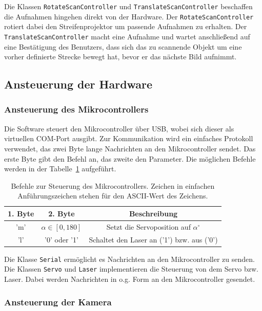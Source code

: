 \documentclass[ngerman,a4paper,parskip=half]{scrartcl}
\begin{document}
Die Klassen \texttt{RotateScanController} und \texttt{TranslateScanController} beschaffen die Aufnahmen hingehen direkt von der Hardware. Der \texttt{RotateScanController} rotiert dabei den Streifenprojektor um passende Aufnahmen zu erhalten. Der \texttt{TranslateScanController} macht eine Aufnahme und wartet anschließend auf eine Bestätigung des Benutzers, dass sich das zu scannende Objekt um eine vorher definierte Strecke bewegt hat, bevor er das nächste Bild aufnimmt.

\subsection{Ansteuerung der Hardware}

\subsubsection{Ansteuerung des Mikrocontrollers}

Die Software steuert den Mikrocontroller über USB, wobei sich dieser als virtuellen COM-Port ausgibt. Zur Kommunikation wird ein einfaches Protokoll verwendet, das zwei Byte lange Nachrichten an den Mikrocontroller sendet. Das erste Byte gibt den Befehl an, das zweite den Parameter. Die möglichen Befehle werden in der Tabelle~\ref{tab:protocol} aufgeführt.

\begin{table}
	\centering
	\begin{tabular}{|c|c|c|}
		\hline
		\bfseries 1. Byte & \bfseries 2. Byte & \bfseries Beschreibung \\
		\hline
		'm' & $\alpha \in [0,180]$ & Setzt die Servoposition auf $\alpha^\circ$\\
		\hline
		'l' & '0' oder '1' & Schaltet den Laser an ('1') bzw. aus ('0')\\
		\hline
	\end{tabular}
	\caption{Befehle zur Steuerung des Mikrocontrollers. Zeichen in einfachen Anführungszeichen stehen für den ASCII-Wert des Zeichens.}
	\label{tab:protocol}
\end{table}

Die Klasse \texttt{Serial} ermöglicht es Nachrichten an den Mikrocontroller zu senden. Die Klassen \texttt{Servo} und \texttt{Laser} implementieren die Steuerung von dem Servo bzw. Laser. Dabei werden Nachrichten in o.g. Form an den Mikrocontroller gesendet.

\subsubsection{Ansteuerung der Kamera}
\end{document}
